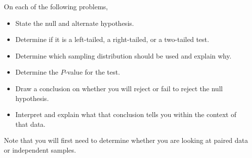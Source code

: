 \documentclass{article}
\begin{document}
\pagestyle{myheadings}

\begin{center}
\textbf{}
\end{center}

On each of the following problems,
	\begin{itemize}
	\item State the null and alternate hypothesis.
	\item Determine if it is a left-tailed, a right-tailed, or a two-tailed test.
	\item Determine which sampling distribution should be used and explain why.
	\item Determine the $P$-value for the test.
	\item Draw a conclusion on whether you will reject or fail to reject the null hypothesis.
	\item Interpret and explain what that conclusion tells you within the context of that data.
	\end{itemize}
Note that you will first need to determine whether you are looking at paired data or independent samples.
\end{document}
